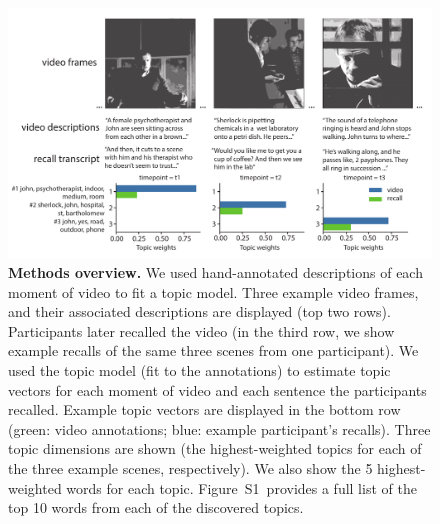 \documentclass{article}
\newcommand{\topics}{S1}
\begin{document}
\begin{figure}[tp]
\centering
\includegraphics[width=1\textwidth]{figs/analysis_schematic_bw}
\caption{\small \textbf{Methods overview.} We used hand-annotated descriptions of each moment of video to fit a topic model.  Three example video frames, and their associated descriptions are displayed (top two rows).  Participants later recalled the video (in the third row, we show example recalls of the same three scenes from one participant).  We used the topic model (fit to the annotations) to estimate topic vectors for each moment of video and each sentence the participants recalled.  Example topic vectors are displayed in the bottom row (green: video annotations; blue: example participant's recalls).  Three topic dimensions are shown (the highest-weighted topics for each of the three example scenes, respectively).  We also show the 5 highest-weighted words for each topic.  Figure~\topics~provides a full list of the top 10 words from each of the discovered topics.}
\label{fig:schematic}
\end{figure}
\end{document}
